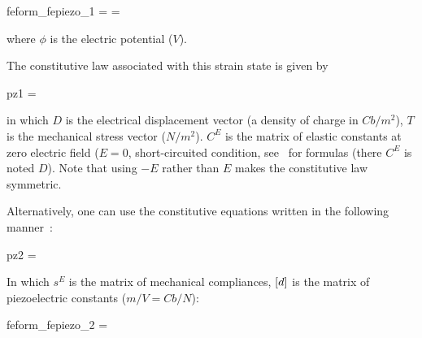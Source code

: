 \begin{SDT}
\begin{eqsvg}{feform_fepiezo_1}
 =
=
\end{eqsvg}
where $\phi$ is the electric potential ($V$).

The constitutive law associated with this strain state is given by
%
\begin{eqsvg}{pz1}
 = 
\end{eqsvg}
in which $D$ is the electrical displacement vector (a density of charge in $Cb/m^2$), $T$ is the mechanical stress vector ($N/m^2$). $C^E$ is the matrix of elastic constants at zero electric field ($E=0$, short-circuited condition, see~ for formulas (there $C^E$ is noted $D$). Note that using $-E$ rather than $E$ makes the constitutive law symmetric.


Alternatively, one can use the constitutive equations written in the following manner~:
\begin{eqsvg}{pz2}
 = 
\end{eqsvg}
In which $s^E$ is the matrix of mechanical compliances, $\left[d\right]$
is the matrix of piezoelectric constants ($m/V=Cb/N$):
\begin{eqsvg}{feform_fepiezo_2}
  = 
 \end{eqsvg}


\end{SDT}
